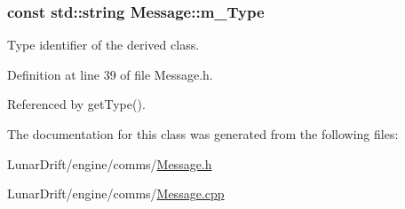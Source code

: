 \subsubsection[{\texorpdfstring{m\+\_\+\+Type}{m_Type}}]{\setlength{\rightskip}{0pt plus 5cm}const std\+::string Message\+::m\+\_\+\+Type\hspace{0.3cm}{\ttfamily [private]}}\hypertarget{class_message_ae74bd8f969ef873186859fc3a7ad0e41}{}\label{class_message_ae74bd8f969ef873186859fc3a7ad0e41}


Type identifier of the derived class. 



Definition at line 39 of file Message.\+h.



Referenced by get\+Type().



The documentation for this class was generated from the following files\+:\begin{DoxyCompactItemize}
\item 
Lunar\+Drift/engine/comms/\hyperlink{_message_8h}{Message.\+h}\item 
Lunar\+Drift/engine/comms/\hyperlink{_message_8cpp}{Message.\+cpp}\end{DoxyCompactItemize}
